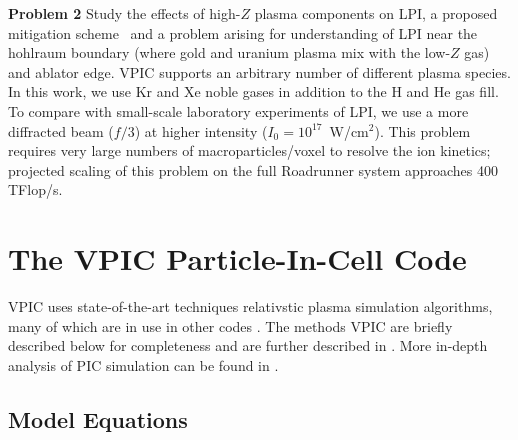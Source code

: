 \documentclass[10pt]{article}
\begin{document}
\textbf{Problem 2}
Study the effects of high-$Z$ plasma components on LPI, a proposed
mitigation scheme~\cite{Lushnikov_PPCF_2006} and a problem arising for
understanding of LPI near the hohlraum boundary (where gold and
uranium plasma mix with the low-$Z$ gas) and ablator edge.  VPIC
supports an arbitrary number of different plasma species.  In this
work, we use Kr and Xe noble gases in addition to the H and He gas
fill.  To compare with small-scale laboratory experiments of LPI, we
use a more diffracted beam ($f/3$) at higher intensity ($I_0 =
10^{17}$~W/cm$^2$). This problem requires very large numbers of
macroparticles/voxel to resolve the ion kinetics; projected scaling of
this problem on the full Roadrunner system approaches 400 TFlop/s.



\section{The VPIC Particle-In-Cell Code}

VPIC uses state-of-the-art techniques relativstic plasma simulation
algorithms, many of which are in use in other codes
\cite{Blahovec_et_al_2000,Eastwood_et_al_1995,Jones_et_al_1996,Kwan_Snell_1985,Nieter_Cary_2004,Verboncoeur_et_al_1995}.
The methods VPIC are briefly described below for completeness and are
further described in \cite{Bowers_et_al_Phys_Plasmas_2007}.  More
in-depth analysis of PIC simulation can be found in
\cite{Birdsall_Langdon_1985,Hockney_Eastwood_1988}.

\subsection{Model Equations}
\end{document}
